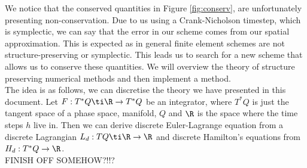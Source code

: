 \newpage
\noindent
We notice that the conserved quantities in Figure \ref{fig:conserv}, are unfortunately presenting non-conservation. Due to us using a Crank-Nicholson timestep, which is symplectic, we can say that the error in our scheme comes from our spatial approximation. This is expected as in general finite element schemes are not structure-preserving or symplectic. This leads us to search for a new scheme that allows us to conserve these quantities. We will overview the theory of structure preserving numerical methods and then implement a method. \\

\noindent
The idea is as follows, we can discretise the theory we have presented in this document. Let $F : T^*Q \ti \R \to T^*Q$ be an integrator, where $T^*Q$ is just the tangent space of a phase space, manifold, $Q$ and $\R$ is the space where the time steps $h$ live in. Then we can derive discrete Euler-Lagrange equation from a discrete Lagrangian $L_d : TQ \ti \R \to \R$ and discrete Hamilton's equations from $H_d : T^*Q\to \R$.\\

\noindent
FINISH OFF SOMEHOW?!!?
